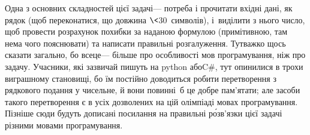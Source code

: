 \Tutorial
Одна з основних складностей цієї задачі\nolinebreak[3] --- потреба і прочитати вхідні дані, як рядок (щоб переконатися, що довжина $\<$30~символів), і~виділити з нього число, щоб провести розрахунок похибки за наданою формулою (примітивною, там нема чого пояснювати) та написати правильні розгалуження. Тут\nolinebreak[3] важко щось сказати загально, бо все\nolinebreak[3] це\nolinebreak[3] --- більше про особливості %
мов програмування, ніж про задачу. %
Учасники, які зазвичай пишуть на python або\nolinebreak[3] C\#, тут опинилися в трохи виграшному становищі, бо їм постійно доводиться робити перетворення з рядкового подання у чисельне, й вони повинні~б це добре пам'ятати; але засоби такого перетворення %
є в усіх дозволених на цій олімпіаді мовах програмування.
\TODO %
Пізніше сюди будуть дописані посилання на правильні р\'{о}зв'язки цієї задачі різними мовами програмування.

